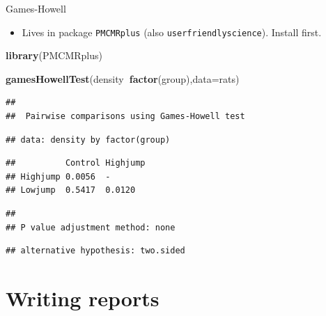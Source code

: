 \documentclass[ignorenonframetext,]{beamer}
\newenvironment{Shaded}{\begin{snugshade}}{\end{snugshade}}
\newcommand{\DataTypeTok}[1]{\textcolor[rgb]{0.13,0.29,0.53}{#1}}
\newcommand{\KeywordTok}[1]{\textcolor[rgb]{0.13,0.29,0.53}{\textbf{#1}}}
\newcommand{\NormalTok}[1]{#1}
\newcommand{\OperatorTok}[1]{\textcolor[rgb]{0.81,0.36,0.00}{\textbf{#1}}}
\providecommand{\tightlist}{%
  \setlength{\itemsep}{0pt}\setlength{\parskip}{0pt}}
\begin{document}
\begin{frame}[fragile]{Games-Howell}
\protect\hypertarget{games-howell}{}

\begin{itemize}
\tightlist
\item
  Lives in package \texttt{PMCMRplus} (also
  \texttt{userfriendlyscience}). Install first.
\end{itemize}

\begin{Shaded}
\begin{Highlighting}[]
\KeywordTok{library}\NormalTok{(PMCMRplus)}
\end{Highlighting}
\end{Shaded}

\begin{Shaded}
\begin{Highlighting}[]
\KeywordTok{gamesHowellTest}\NormalTok{(density}\OperatorTok{~}\KeywordTok{factor}\NormalTok{(group),}\DataTypeTok{data=}\NormalTok{rats)}
\end{Highlighting}
\end{Shaded}

\begin{verbatim}
## 
##  Pairwise comparisons using Games-Howell test
\end{verbatim}

\begin{verbatim}
## data: density by factor(group)
\end{verbatim}

\begin{verbatim}
##          Control Highjump
## Highjump 0.0056  -       
## Lowjump  0.5417  0.0120
\end{verbatim}

\begin{verbatim}
## 
## P value adjustment method: none
\end{verbatim}

\begin{verbatim}
## alternative hypothesis: two.sided
\end{verbatim}

\end{frame}

\hypertarget{writing-reports}{%
\section{Writing reports}\label{writing-reports}}
\end{document}
